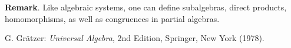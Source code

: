 \documentclass[12pt]{article}
\begin{document}
\textbf{Remark}.  Like algebraic systems, one can define subalgebras, direct products, homomorphisms, as well as congruences in partial algebras.

\begin{thebibliography}{7}
 G. Gr\"{a}tzer: {\em Universal Algebra}, 2nd Edition, Springer, New York (1978).
\end{thebibliography}
\end{document}
